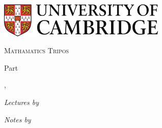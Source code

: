\begin{titlepage}
  \begin{center}
    \includegraphics[width=0.6\textwidth]{logo.jpg}\par
    \vspace{1cm}
    {\scshape\huge Mathamatics Tripos \par}
    \vspace{2cm}
    {\huge Part \npart \par}
    \vspace{0.6cm}
    {\Huge \bfseries \ntitle \par}
    \vspace{1.2cm}
    {\Large\nterm, \nyear \par}
    \vspace{2cm}
    
    {\large \emph{Lectures by } \par}
    \vspace{0.2cm}
    {\Large \scshape \nlecturer}
    
    \vspace{0.5cm}
    {\large \emph{Notes by }\par}
    \vspace{0.2cm}
    {\Large \scshape \href{mailto:\nauthoremail}{\nauthor}}
 \end{center}
\end{titlepage}